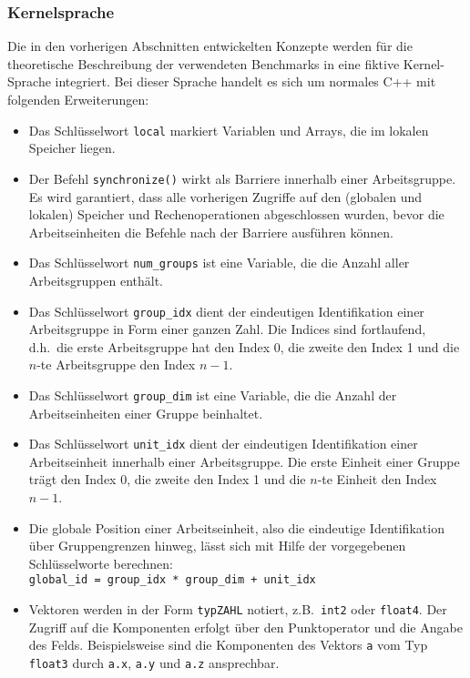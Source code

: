 \subsubsection{Kernelsprache}

Die in den vorherigen Abschnitten entwickelten Konzepte werden für die
theoretische Beschreibung der verwendeten Benchmarks in eine fiktive
Kernel-Sprache integriert. Bei dieser Sprache handelt es sich um normales C++
mit folgenden Erweiterungen:

\begin{itemize}
    \item Das Schlüsselwort \texttt{local} markiert Variablen und Arrays, die im
          lokalen Speicher liegen.
    \item Der Befehl \texttt{synchronize()} wirkt als Barriere innerhalb einer
          Arbeitsgruppe. Es wird garantiert, dass alle vorherigen Zugriffe auf
          den (globalen und lokalen) Speicher und Rechenoperationen
          abgeschlossen wurden, bevor die Arbeitseinheiten die Befehle nach der
          Barriere ausführen können.
    \item Das Schlüsselwort \texttt{num\_groups} ist eine Variable, die die
          Anzahl aller Arbeitsgruppen enthält.
    \item Das Schlüsselwort \texttt{group\_idx} dient der eindeutigen
          Identifikation einer Arbeitsgruppe in Form einer ganzen Zahl. Die
          Indices sind fortlaufend, d.h.\ die erste Arbeitsgruppe hat den
          Index 0, die zweite den Index 1 und die $n$-te Arbeitsgruppe den
          Index $n - 1$.
    \item Das Schlüsselwort \texttt{group\_dim} ist eine Variable, die die
          Anzahl der Arbeitseinheiten einer Gruppe beinhaltet.
    \item Das Schlüsselwort \texttt{unit\_idx} dient der eindeutigen
          Identifikation einer Arbeitseinheit innerhalb einer Arbeitsgruppe. Die
          erste Einheit einer Gruppe trägt den Index 0, die zweite den Index 1
          und die $n$-te Einheit den Index $n - 1$.
    \item Die globale Position einer Arbeitseinheit, also die eindeutige
          Identifikation über Gruppengrenzen hinweg, lässt sich mit Hilfe der
          vorgegebenen Schlüsselworte berechnen:\\
          \texttt{global\_id = group\_idx * group\_dim + unit\_idx}
    \item Vektoren werden in der Form \texttt{typZAHL} notiert, z.B.\
          \texttt{int2} oder \texttt{float4}. Der Zugriff auf die Komponenten
          erfolgt über den Punktoperator und die Angabe des Felds.
          Beispielsweise sind die Komponenten des Vektors \texttt{a} vom Typ
          \texttt{float3} durch \texttt{a.x}, \texttt{a.y} und \texttt{a.z}
          ansprechbar.
\end{itemize}

